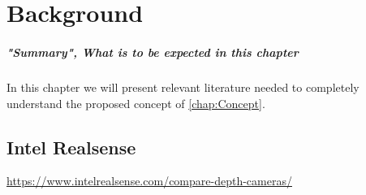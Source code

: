 \documentclass[main.tex]{subfiles}
\begin{document}
\chapter{Background}\label{chap:Background}
\paragraph*{"Summary", What is to be expected in this chapter}
In this chapter we will present relevant literature needed to completely understand the proposed concept of \autoref{chap:Concept}.


\section{Intel Realsense}
\href{https://www.intelrealsense.com/compare-depth-cameras/}{https://www.intelrealsense.com/compare-depth-cameras/}
\end{document}

